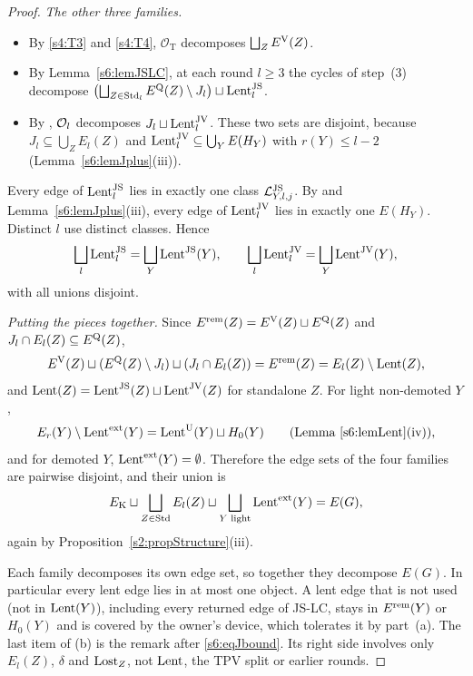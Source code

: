 \begin{proof}
\emph{The other three families.}
\begin{itemize}
\item By \ref{s4:T3} and \ref{s4:T4}, $\mathcal O_{\mathrm T}$ decomposes $\bigsqcup_ZE^{\mathrm{V}}(Z)$.
\item By Lemma~\ref{s6:lemJSLC}, at each round $l\ge3$ the cycles of step~(3) decompose $\bigl(\bigsqcup_{Z\in\mathrm{Std}_l}E^{\mathrm{Q}}(Z)\setminus J_l\bigr)\sqcup\mathrm{Lent}^{\mathrm{JS}}_l$.
\item By , $\mathcal{O}_l$ decomposes $J_l\sqcup\mathrm{Lent}^{\mathrm{JV}}_l$. These two sets are disjoint, because $J_l\subseteq\bigcup_ZE_l(Z)$ and $\mathrm{Lent}^{\mathrm{JV}}_l\subseteq\bigcup_YE(H_Y)$ with $r(Y)\le l-2$ (Lemma~\ref{s6:lemJplus}(iii)).
\end{itemize}
Every edge of $\mathrm{Lent}^{\mathrm{JS}}_l$ lies in exactly one class $\mathcal{L}^{\mathrm{JS}}_{Y,l,j}$. By  and Lemma~\ref{s6:lemJplus}(iii), every edge of $\mathrm{Lent}^{\mathrm{JV}}_l$ lies in exactly one $E(H_Y)$. Distinct $l$ use distinct classes. Hence
\[
\bigsqcup_l\mathrm{Lent}^{\mathrm{JS}}_l=\bigsqcup_Y\mathrm{Lent}^{\mathrm{JS}}(Y),\qquad\bigsqcup_l\mathrm{Lent}^{\mathrm{JV}}_l=\bigsqcup_Y\mathrm{Lent}^{\mathrm{JV}}(Y),
\]
with all unions disjoint.

\emph{Putting the pieces together.} Since $E^{\mathrm{rem}}(Z)=E^{\mathrm{V}}(Z)\sqcup E^{\mathrm{Q}}(Z)$ and $J_l\cap E_l(Z)\subseteq E^{\mathrm{Q}}(Z)$,
\[
E^{\mathrm{V}}(Z)\sqcup(E^{\mathrm{Q}}(Z)\setminus J_l)\sqcup(J_l\cap E_l(Z))=E^{\mathrm{rem}}(Z)=E_l(Z)\setminus\mathrm{Lent}(Z),
\]
and $\mathrm{Lent}(Z)=\mathrm{Lent}^{\mathrm{JS}}(Z)\sqcup\mathrm{Lent}^{\mathrm{JV}}(Z)$ for standalone $Z$. For light non-demoted $Y$,
\[
E_r(Y)\setminus\mathrm{Lent}^{\mathrm{ext}}(Y)=\mathrm{Lent}^{\mathrm{U}}(Y)\sqcup H_0(Y)\qquad\text{(Lemma~\ref{s6:lemLent}(iv))},
\]
and for demoted $Y$, $\mathrm{Lent}^{\mathrm{ext}}(Y)=\emptyset$. Therefore the edge sets of the four families are pairwise disjoint, and their union is
\[
E_{\mathrm K}\sqcup\bigsqcup_{Z\in\mathrm{Std}}E_l(Z)\sqcup\bigsqcup_{Y\text{ light}}\mathrm{Lent}^{\mathrm{ext}}(Y)=E(G),
\]
again by Proposition~\ref{s2:propStructure}(iii).

Each family decomposes its own edge set, so together they decompose $E(G)$. In particular every lent edge lies in at most one object. A lent edge that is not used (not in $\mathrm{Lent}(Y)$), including every returned edge of JS-LC, stays in $E^{\mathrm{rem}}(Y)$ or $H_0(Y)$ and is covered by the owner's device, which tolerates it by part~(a). The last item of (b) is the remark after \eqref{s6:eqJbound}. Its right side involves only $E_l(Z)$, $\delta$ and $\mathrm{Lost}_Z$, not $\mathrm{Lent}$, the TPV split or earlier rounds.


\end{proof}

